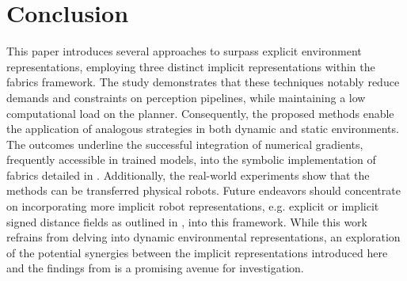 \section{Conclusion}
\label{sec:ral24_conclusion}

This paper introduces several approaches to surpass explicit environment
representations, employing three distinct implicit representations within the
\ac{fabrics} framework. The study demonstrates that these techniques notably
reduce demands and constraints on perception pipelines, while maintaining a low
computational load on the planner. Consequently, the proposed methods enable the
application of analogous strategies in both dynamic and static environments. The
outcomes underline the successful integration of numerical gradients, frequently
accessible in trained models, into the symbolic implementation of \ac{fabrics}
detailed in \cite{Spahn2023}. Additionally, the real-world experiments show that
the methods can be transferred physical robots.
Future endeavors should concentrate on
incorporating more implicit robot representations, e.g. explicit or implicit
signed distance fields as outlined in
\cite{Liu2022regularized,Koptev2023neural}, into this framework. While this work
refrains from delving into dynamic environmental representations, an exploration
of the potential synergies between the implicit representations introduced here
and the findings from \cite{Spahn2023} is a promising avenue for investigation.
